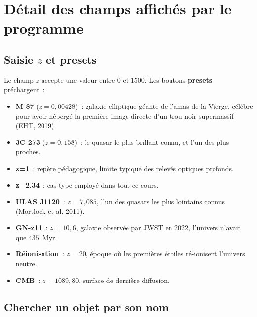 \documentclass[11pt,a4paper,openany]{report}
\begin{document}
\section{Détail des champs affichés par le programme}

\subsection{Saisie $z$ et presets}

\begin{tcolorbox}[gui]
Le champ $z$ accepte une valeur entre $0$ et $1500$. Les boutons
\textbf{presets} préchargent~:
\begin{itemize}[topsep=2pt]
\item \textbf{M 87} ($z=0{,}00428$)~: galaxie elliptique géante de l'amas
  de la Vierge, célèbre pour avoir hébergé la première image directe d'un
  trou noir supermassif (EHT, 2019).
\item \textbf{3C 273} ($z=0{,}158$)~: le quasar le plus brillant connu, et
  l'un des plus proches.
\item \textbf{z=1}~: repère pédagogique, limite typique des relevés
  optiques profonds.
\item \textbf{z=2.34}~: cas type employé dans tout ce cours.
\item \textbf{ULAS J1120}~: $z = 7{,}085$, l'un des quasars les plus lointains
  connus (Mortlock et al. 2011).
\item \textbf{GN-z11}~: $z=10{,}6$, galaxie observée par JWST en 2022,
  l'univers n'avait que $435$~Myr.
\item \textbf{Réionisation}~: $z=20$, époque où les premières étoiles
  ré-ionisent l'univers neutre.
\item \textbf{CMB}~: $z=1089{,}80$, surface de dernière diffusion.
\end{itemize}
\end{tcolorbox}

\subsection{Chercher un objet par son nom}
\label{sec:simbad}
\end{document}
